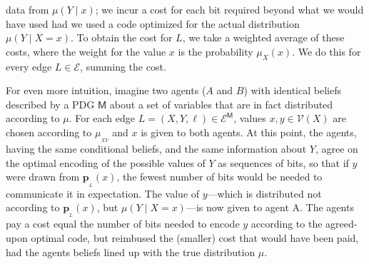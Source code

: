 \documentclass{article}
\theoremstyle{plain}
\theoremstyle{definition}
\theoremstyle{remark}
\newcommand\mat[1]{\mathbf{#1}}
\newcommand{\bp}[1][L]{\mat{p}_{\!_{#1}\!}}
\newcommand{\V}{\mathcal V}
\newcommand{\Ed}{\mathcal E}
\newcommand{\sfM}{\mathsf M}
\numberwithin{equation}{section}
\begin{document}
{%
        data from $\mu(Y\mid x)$; we incur a cost for each bit
        required beyond what we would have used had we used a code
                optimized for the actual distribution $\mu(Y\mid X=x)$.  
       To obtain the cost for $L$, we take a weighted average of these costs, where the weight for the value $x$ is the probability $\mu_X(x)$. We do this for every edge $L \in \Ed$, summing the cost.

	For even more intuition, imagine two agents ($A$ and $B$) with identical
        beliefs described by a PDG $\sfM$ about a set of variables
        that are in fact 
        distributed according to $\mu$. For each edge $L = (X,Y, \ell)
        \in \Ed^\sfM$, values $x,y \in \V(X)$ are chosen according to
               $\mu_{_{XY}}$ and $x$ is given to both
        agents. 
		At this point, the agents, having the same conditional beliefs, and
		the same information about $Y$, agree on the optimal encoding 
		of the possible values of $Y$ as sequences of bits, so that if $y$
		were drawn from $\bp(x)$, the fewest number of bits would be needed
		to communicate it in expectation. The value of $y$---which is distributed
		not according to $\bp(x)$, but $\mu(Y \mid X=x)$---is now given to agent A.
		The agents pay a cost equal the number of bits needed to encode $y$ according
		to the agreed-upon optimal code, but reimbused the (smaller) cost that would have been paid,
		had the agents beliefs lined up with the true distribution $\mu$.
		
}
\end{document}

